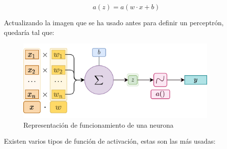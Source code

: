 \begin{equation}
    a(z) = a(w \cdot x + b)
    \label{eqn:activationfunctionbasic}
\end{equation}

Actualizando la imagen que se ha usado antes para definir un perceptrón, quedaría tal que:
\begin{figure}[H]
    \centering
    \includegraphics[width=10cm]{images/state-of-art/activation-functions/activation_representation.png}
    \caption{Representación de funcionamiento de una neurona}
    \label{fig:basicneuron}
\end{figure}

Existen varios tipos de función de activación, estas son las más usadas:

